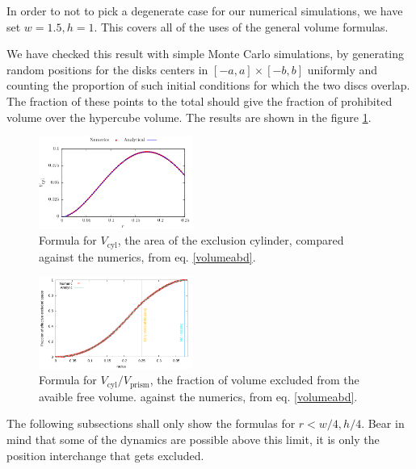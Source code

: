\documentclass[letterpaper,10pt, jcp, aps]{revtex4-1}
\begin{document}
In order to not to pick a degenerate case for our numerical simulations,
we have set $w=1.5, h=1$. This covers all of the uses of the general volume formulas.


We have checked this result with simple Monte Carlo simulations, 
by generating random positions for the disks centers in 
$[-a,a] \times [-b,b]$ uniformly and 
counting the proportion of such initial conditions for 
which the two discs overlap. The fraction of these points to the 
total should give the fraction of prohibited volume over the hypercube
volume. The results are shown in the figure \ref{VolMonteC}.

\begin{figure}[h]
\centering
\includegraphics[width=0.45\textwidth]{./FigurasPerfectas/VolCyl02.pdf}
\caption{Formula for $V_\text{cyl}$, the area of the exclusion cylinder, compared
  against the numerics, from eq. \ref{volumeabd}.
}%
\end{figure}

\begin{figure}[h]
\centering
\includegraphics[width=0.45\textwidth]{./FigurasPerfectas/VolumenExacto01.pdf}
\caption{Formula for $V_\text{cyl}/V_\text{prism}$, the fraction of volume excluded from
  the avaible free volume.
  against the numerics, from eq. \ref{volumeabd}.
}\label{VolMonteC}%
\end{figure}


The following subsections shall only show the formulas for $r<w/4, h/4$.
Bear in mind that some of the dynamics are possible above this limit,
it is only the position interchange that gets excluded. \\
\end{document}
